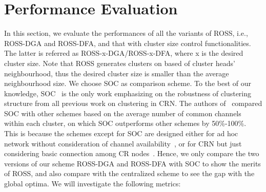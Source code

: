 \documentclass[journal,comsoc]{IEEEtran}
\theoremstyle{mytheoremstyle}
\theoremstyle{mytheoremstyle}
\theoremstyle{mytheoremstyle}
\newcommand{\ie}{i.e., }
\begin{document}
\section{Performance Evaluation}
\label{performance}
In this section, we evaluate the performances of all the variants of ROSS, \ie ROSS-DGA and ROSS-DFA, and that with cluster size control functionalities.
The latter is referred as ROSS-x-DGA/ROSS-x-DFA, where x is the desired cluster size.
Note that ROSS generates clusters on based of cluster heads' neighbourhood, thus the desired cluster size is smaller than the average neighbourhood size.
We choose SOC as comparison scheme.
To the best of our knowledge, SOC~\cite{Lazos09} is the only work emphasizing on the robustness of clustering structure from all previous work on clustering in CRN. The authors of~\cite{Lazos09} compared SOC with other schemes based on the average number of common channels within each cluster, on which SOC outperforms other schemes by 50\%-100\%. This is because the schemes except for SOC are designed either for ad hoc network without consideration of channel availability~\cite{Basagni99}, or for CRN  but just considering basic connection among CR nodes~\cite{Zhao07}. Hence, we only compare the two versions of our scheme ROSS-DGA and ROSS-DFA with SOC to show the merits of ROSS, and also compare with the centralized scheme to see the gap with the global optima. 
We will investigate the following metrics:
\end{document}
